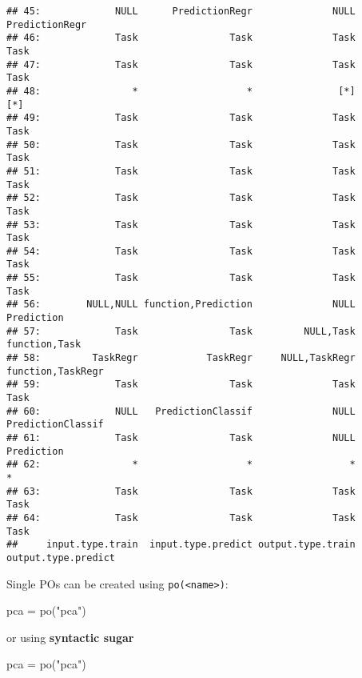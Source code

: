\documentclass[
]{scrbook}
\newenvironment{Shaded}{\begin{snugshade}}{\end{snugshade}}
\newcommand{\FunctionTok}[1]{\textcolor[rgb]{0.00,0.00,0.00}{#1}}
\newcommand{\NormalTok}[1]{#1}
\newcommand{\OtherTok}[1]{\textcolor[rgb]{0.56,0.35,0.01}{#1}}
\newcommand{\StringTok}[1]{\textcolor[rgb]{0.31,0.60,0.02}{#1}}
\renewenvironment{Shaded} {\begin{snugshade}\small} {\end{snugshade}}
\begin{document}
\begin{verbatim}
## 45:             NULL      PredictionRegr              NULL      PredictionRegr
## 46:             Task                Task              Task                Task
## 47:             Task                Task              Task                Task
## 48:                *                   *               [*]                 [*]
## 49:             Task                Task              Task                Task
## 50:             Task                Task              Task                Task
## 51:             Task                Task              Task                Task
## 52:             Task                Task              Task                Task
## 53:             Task                Task              Task                Task
## 54:             Task                Task              Task                Task
## 55:             Task                Task              Task                Task
## 56:        NULL,NULL function,Prediction              NULL          Prediction
## 57:             Task                Task         NULL,Task       function,Task
## 58:         TaskRegr            TaskRegr     NULL,TaskRegr   function,TaskRegr
## 59:             Task                Task              Task                Task
## 60:             NULL   PredictionClassif              NULL   PredictionClassif
## 61:             Task                Task              NULL          Prediction
## 62:                *                   *                 *                   *
## 63:             Task                Task              Task                Task
## 64:             Task                Task              Task                Task
##     input.type.train  input.type.predict output.type.train output.type.predict
\end{verbatim}

Single POs can be created using \texttt{po(\textless{}name\textgreater{})}:

\begin{Shaded}
\begin{Highlighting}[]
\NormalTok{pca }\OtherTok{=} \FunctionTok{po}\NormalTok{(}\StringTok{"pca"}\NormalTok{)}
\end{Highlighting}
\end{Shaded}

or using \textbf{syntactic sugar}

\begin{Shaded}
\begin{Highlighting}[]
\NormalTok{pca }\OtherTok{=} \FunctionTok{po}\NormalTok{(}\StringTok{"pca"}\NormalTok{)}
\end{Highlighting}
\end{Shaded}
\end{document}
